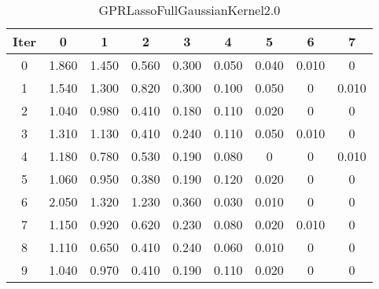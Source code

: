 \begin{table}
	\begin{center}
		\begin{tabular}{|c|c|c|c|c|c|c|c|c|}
			\hline
			Iter & 0 & 1 & 2 & 3 & 4 & 5 & 6 & 7 \\
			\hline
			0 & 1.860 & 1.450 & 0.560 & 0.300 & 0.050 & 0.040 & 0.010 & 0 \\
			\hline
			1 & 1.540 & 1.300 & 0.820 & 0.300 & 0.100 & 0.050 & 0 & 0.010 \\
			\hline
			2 & 1.040 & 0.980 & 0.410 & 0.180 & 0.110 & 0.020 & 0 & 0 \\
			\hline
			3 & 1.310 & 1.130 & 0.410 & 0.240 & 0.110 & 0.050 & 0.010 & 0 \\
			\hline
			4 & 1.180 & 0.780 & 0.530 & 0.190 & 0.080 & 0 & 0 & 0.010 \\
			\hline
			5 & 1.060 & 0.950 & 0.380 & 0.190 & 0.120 & 0.020 & 0 & 0 \\
			\hline
			6 & 2.050 & 1.320 & 1.230 & 0.360 & 0.030 & 0.010 & 0 & 0 \\
			\hline
			7 & 1.150 & 0.920 & 0.620 & 0.230 & 0.080 & 0.020 & 0.010 & 0 \\
			\hline
			8 & 1.110 & 0.650 & 0.410 & 0.240 & 0.060 & 0.010 & 0 & 0 \\
			\hline
			9 & 1.040 & 0.970 & 0.410 & 0.190 & 0.110 & 0.020 & 0 & 0 \\
			\hline
		\end{tabular}
	\end{center}
	\caption{GPRLassoFullGaussianKernel2.0}
\end{table}